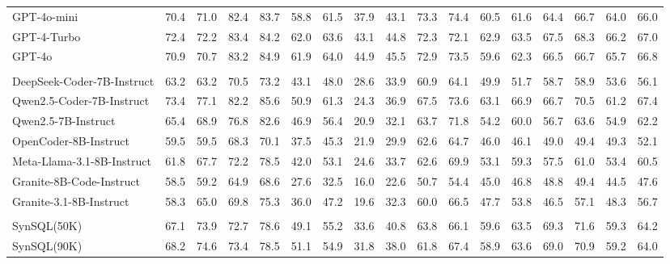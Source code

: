 \begin{table}[t]
{\begin{tabular}{l|cccccccccccccc|cc}
\midrule
\rowcolor[rgb]{.867, .922, .969}
\multicolumn{17}{c}{\textit{\textbf{Closed-source LLMs}}} \\
\midrule
GPT-4o-mini & 70.4 & 71.0 & 82.4 & 83.7 & 58.8 & 61.5 & 37.9 & 43.1 & 73.3 & 74.4 & 60.5 & 61.6 & 64.4 & 66.7 & 64.0 & 66.0 \\
GPT-4-Turbo & 72.4 & 72.2 & 83.4 & 84.2 & 62.0 & 63.6 & 43.1 & 44.8 & 72.3 & 72.1 & 62.9 & 63.5 & 67.5 & 68.3 & 66.2 & 67.0\\
GPT-4o & 70.9 & 70.7 & 83.2 & 84.9 & 61.9 & 64.0 & 44.9 & 45.5 & 72.9 & 73.5 & 59.6 & 62.3 & 66.5 & 66.7 & 65.7 & 66.8 \\
\midrule
\rowcolor[rgb]{.867, .922, .969}
\multicolumn{17}{c}{\textit{\textbf{Open-source LLMs}}} \\
\midrule
DeepSeek-Coder-7B-Instruct & 63.2 & 63.2 & 70.5 & 73.2 & 43.1 & 48.0 & 28.6 & 33.9 & 60.9 & 64.1 & 49.9 & 51.7 & 58.7 & 58.9 & 53.6 & 56.1 \\
Qwen2.5-Coder-7B-Instruct & 73.4 & 77.1 & 82.2 & 85.6 & 50.9 & 61.3 & 24.3 & 36.9 & 67.5 & 73.6 & 63.1 & 66.9 & 66.7 & 70.5 & 61.2 & 67.4\\
Qwen2.5-7B-Instruct & 65.4 & 68.9 & 76.8 & 82.6 & 46.9 & 56.4 & 20.9 & 32.1 & 63.7 & 71.8 & 54.2 & 60.0 & 56.7 & 63.6 & 54.9 & 62.2 \\
OpenCoder-8B-Instruct & 59.5 & 59.5 & 68.3 & 70.1 & 37.5 & 45.3 & 21.9 & 29.9 & 62.6 & 64.7 & 46.0 & 46.1 & 49.0 & 49.4 & 49.3 & 52.1 \\
Meta-Llama-3.1-8B-Instruct & 61.8 & 67.7 & 72.2 & 78.5 & 42.0 & 53.1 & 24.6 & 33.7 & 62.6 & 69.9 & 53.1 & 59.3 & 57.5 & 61.0 & 53.4 & 60.5 \\
Granite-8B-Code-Instruct & 58.5 & 59.2 & 64.9 & 68.6 & 27.6 & 32.5 & 16.0 & 22.6 & 50.7 & 54.4 & 45.0 & 46.8 & 48.8 & 49.4 & 44.5 & 47.6 \\
Granite-3.1-8B-Instruct & 58.3 & 65.0 & 69.8 & 75.3 & 36.0 & 47.2 & 19.6 & 32.3 & 60.0 & 66.5 & 47.7 & 53.8 & 46.5 & 57.1 & 48.3 & 56.7\\
\midrule
\rowcolor[rgb]{.867, .922, .969}
\multicolumn{17}{c}{\textit{\textbf{Trained on Meta-Llama-3.1-8B-Instruct}}} \\
\midrule
SynSQL(50K) & 67.1 & 73.9 & 72.7 & 78.6 & 49.1 & 55.2 & 33.6 & 40.8 & 63.8 & 66.1 & 59.6 & 63.5 & 69.3 & 71.6 & 59.3 & 64.2 \\

SynSQL(90K) & 68.2 & 74.6 & 73.4 & 78.5 & 51.1 & 54.9 & 31.8 & 38.0 & 61.8 & 67.4 & 58.9 & 63.6 & 69.0 & 70.9 & 59.2 & 64.0 \\


\end{tabular}}
\end{table}
